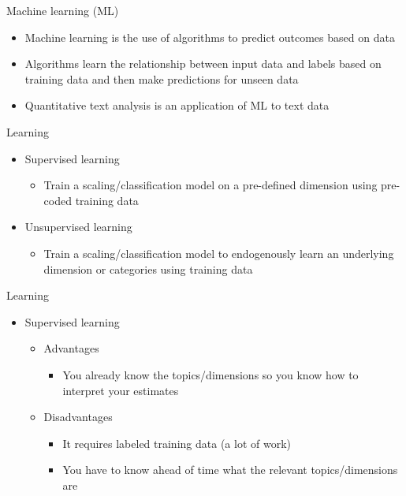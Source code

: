 \documentclass[pdf, 9pt, fleqn, handout]{beamer}
\begin{document}
\begin{frame}{Machine learning (ML)}
\begin{itemize}
\item Machine learning is the use of algorithms to predict outcomes based on data \\[2em]
\item Algorithms learn the relationship between input data and labels based on training data and then make predictions for unseen data \\[2em]
\item Quantitative text analysis is an application of ML to text data
\end{itemize}
\end{frame}

\begin{frame}{Learning}
\begin{itemize}
\item Supervised learning \\[0.5em]
\begin{itemize}
\item Train a scaling/classification model on a pre-defined dimension using pre-coded training data \\[2em]
\end{itemize}
\item Unsupervised learning \\[0.5em]
\begin{itemize}
\item Train a scaling/classification model to endogenously learn an underlying dimension or categories using training data
\end{itemize}
\end{itemize}
\end{frame}

\begin{frame}{Learning}
\begin{itemize}
\item Supervised learning \\[0.5em]
\begin{itemize}
\item Advantages \\[0.5em]
\begin{itemize}
\item You already know the topics/dimensions so you know how to interpret your estimates \\[0.5em]
\end{itemize}
\item Disadvantages \\[0.5em]
\begin{itemize}
\item It requires labeled training data (a lot of work) \\[0.5em]
\item You have to know ahead of time what the relevant topics/dimensions are \\[1em]
\end{itemize}
\end{itemize}
\end{itemize}
\end{frame}
\end{document}
